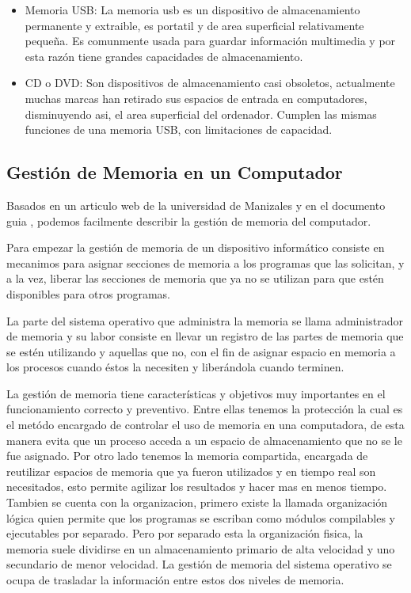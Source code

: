 \documentclass{article}
\begin{document}
\begin{itemize}
\begin{itemize}
        \item
        Memoria USB: La memoria usb es un dispositivo de almacenamiento permanente y extraible, es portatil y de area superficial relativamente pequeña. Es comunmente usada para guardar información multimedia y por esta razón tiene grandes capacidades de almacenamiento.
        
        
        \item
        CD o DVD: Son dispositivos de almacenamiento casi obsoletos, actualmente muchas marcas han retirado sus espacios de entrada en computadores, disminuyendo asi, el area superficial del ordenador. Cumplen las mismas funciones de una memoria USB, con limitaciones de capacidad.
    
    \end{itemize}
    
    
\end{itemize}

\subsection{Gestión de Memoria en un Computador}\label{pregunta3}
Basados en un articulo web de la universidad de Manizales \cite{UdeMa} y en el documento guia \cite{referencia}, podemos facilmente describir la gestión de memoria del computador.

Para empezar la gestión de memoria de un dispositivo informático consiste en mecanimos para asignar secciones de memoria a los programas que las solicitan, y a la vez, liberar las secciones de memoria que ya no se utilizan para que estén disponibles para otros programas. 

La parte del sistema operativo que administra la memoria se llama administrador de memoria y su labor consiste en llevar un registro de las partes de memoria que se estén utilizando y aquellas que no, con el fin de asignar espacio en memoria a los procesos cuando éstos la necesiten y liberándola cuando terminen.

La gestión de memoria tiene características y objetivos muy importantes en el funcionamiento correcto y preventivo. Entre ellas tenemos la protección la cual es el metódo encargado de controlar el uso de memoria en una computadora, de esta manera evita que un proceso acceda a un espacio de almacenamiento que no se le fue asignado. 
Por otro lado tenemos la memoria compartida, encargada de reutilizar espacios de memoria que ya fueron utilizados y en tiempo real son necesitados, esto permite agilizar los resultados y hacer mas en menos tiempo.
Tambien se cuenta con la organizacion, primero existe la llamada organización lógica quien permite que los programas se escriban como módulos compilables y ejecutables por separado. Pero por separado esta la organización fisica, la memoria suele dividirse en un almacenamiento primario de alta velocidad y uno secundario de menor velocidad.  La gestión de memoria del sistema operativo se ocupa de trasladar la información entre estos dos niveles de memoria.
\end{document}
